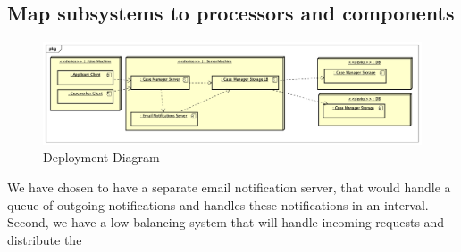 \newpage
\subsection{Map subsystems to processors and components}
\begin{figure}[htb!]
    \centering
    \includegraphics[width=\textwidth]{img/pkg-deployment-diagram.png}
    \caption{Deployment Diagram}
\end{figure}

We have chosen to have a separate email notification server, that would handle a queue of outgoing notifications and handles these notifications in an interval.
Second, we have a low balancing system that will handle incoming requests and distribute the 
